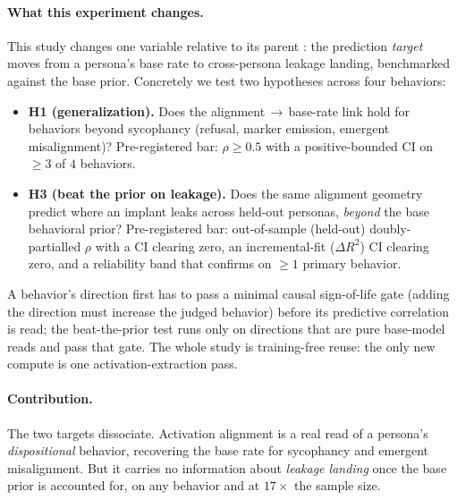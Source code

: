 \documentclass[11pt]{article}
\begin{document}
\paragraph{What this experiment changes.}
This study changes one variable relative to its parent : the
prediction \emph{target} moves from a persona's base rate to cross-persona leakage
landing, benchmarked against the base prior. Concretely we test two hypotheses
across four behaviors:
\begin{itemize}[leftmargin=1.4em,topsep=2pt,itemsep=1pt]
  \item \textbf{H1 (generalization).} Does the alignment\,$\to$\,base-rate link
  hold for behaviors beyond sycophancy (refusal, marker emission, emergent
  misalignment)? Pre-registered bar: $\rho\ge 0.5$ with a positive-bounded CI on
  $\ge 3$ of $4$ behaviors.
  \item \textbf{H3 (beat the prior on leakage).} Does the same alignment geometry
  predict where an implant leaks across held-out personas, \emph{beyond} the base
  behavioral prior? Pre-registered bar: out-of-sample (held-out) doubly-partialled
  $\rho$ with a CI clearing zero, an incremental-fit ($\Delta R^2$) CI clearing
  zero, and a reliability band that confirms on $\ge 1$ primary behavior.
\end{itemize}
A behavior's direction first has to pass a minimal causal sign-of-life gate
(adding the direction must increase the judged behavior) before its predictive
correlation is read; the beat-the-prior test runs only on directions that are
pure base-model reads and pass that gate. The whole study is training-free reuse:
the only new compute is one activation-extraction pass.

\paragraph{Contribution.}
The two targets dissociate. Activation alignment is a real read of a persona's
\emph{dispositional} behavior, recovering the base rate for sycophancy and
emergent misalignment. But it carries no information about \emph{leakage landing}
once the base prior is accounted for, on any behavior and at $17\times$ the sample
size.

\end{document}
